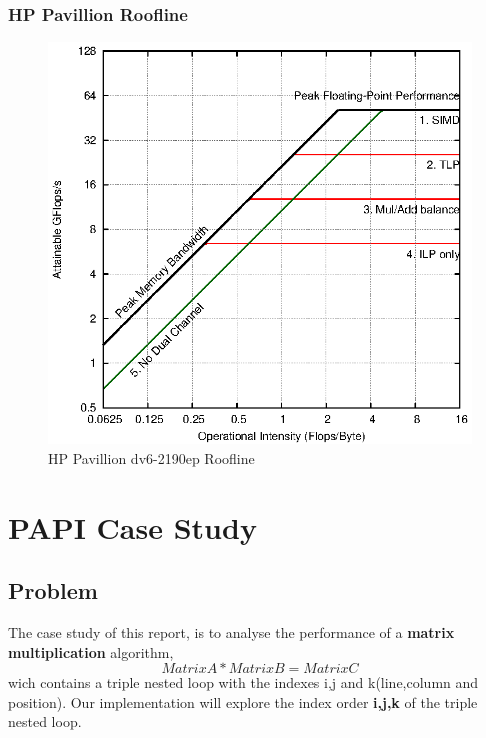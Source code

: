 \documentclass[a4paper,10pt,openright,openbib]{article}
\begin{document}
\subsubsection{HP Pavillion Roofline}
\begin{figure}[!htp]
	\centering
	\begin{minipage}[t]{0.5\linewidth}
		\includegraphics[width=\textwidth]{images/roofline_hp.eps}
		\caption{HP Pavillion dv6-2190ep Roofline \label{fig:roofline2}}
	\end{minipage}
\end{figure}

\section{PAPI Case Study}
\subsection{Problem}
The case study of this report, is to analyse the performance of a \textbf{matrix multiplication} algorithm, \begin{equation}Matrix A * Matrix B = Matrix C\end{equation} wich contains a triple nested loop with the indexes i,j and k(line,column and position). Our implementation will explore the index order \textbf{i,j,k} of the triple nested loop.
\end{document}
